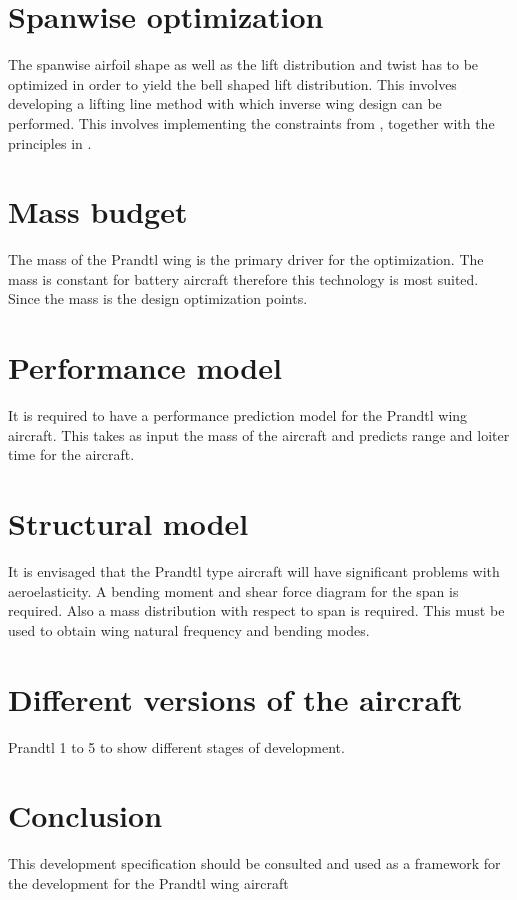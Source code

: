 \documentclass{report}
\begin{document}
\section{Spanwise optimization}


The spanwise airfoil shape as well as the lift distribution and twist has to be optimized in order to yield the bell shaped lift distribution.  This involves developing a lifting line method with which inverse wing design can be performed.  This involves implementing the constraints from \cite{Prandtl1933}, together with the principles in \cite{PrandtlBowers}.

\section{Mass budget}

The mass of the Prandtl wing is the primary driver for the optimization.  The mass is constant for battery aircraft therefore this technology is most suited.  Since the mass is the design optimization points.

\section{Performance model}

It is required to have a performance prediction model for the Prandtl wing aircraft.  This takes as input the mass of the aircraft and predicts range and loiter time for the aircraft.


\section{Structural model}

It is envisaged that the Prandtl type aircraft will have significant problems with aeroelasticity.  A bending moment and shear force diagram for the span is required.  Also a mass distribution with respect to span is required.  This must be used to obtain wing natural frequency and bending modes.


\section{Different versions of the aircraft}

Prandtl 1 to 5 to show different stages of development.

\section{Conclusion}
This development specification should be consulted and used as a framework for the development for the Prandtl wing aircraft
\end{document}
